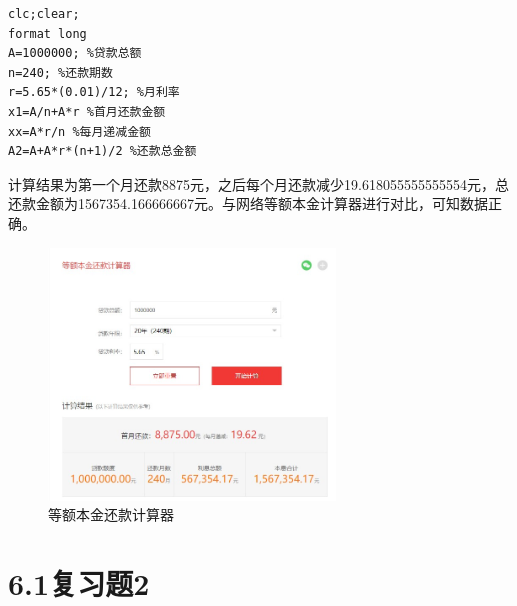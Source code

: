 \documentclass{ctexart}
\begin{document}
\begin{lstlisting}
clc;clear;
format long
A=1000000; %贷款总额
n=240; %还款期数
r=5.65*(0.01)/12; %月利率
x1=A/n+A*r %首月还款金额
xx=A*r/n %每月递减金额
A2=A+A*r*(n+1)/2 %还款总金额
\end{lstlisting}



\setlength{\parindent}{2em}计算结果为第一个月还款8875元，之后每个月还款减少19.618055555555554元，总还款金额为1567354.166666667元。与网络等额本金计算器进行对比，可知数据正确。

\begin{figure}[h!]
\centering
\includegraphics[width=0.68\textwidth]{等额本金.JPG}
\caption{等额本金还款计算器}
\end{figure}


\section{6.1复习题2}
\end{document}
